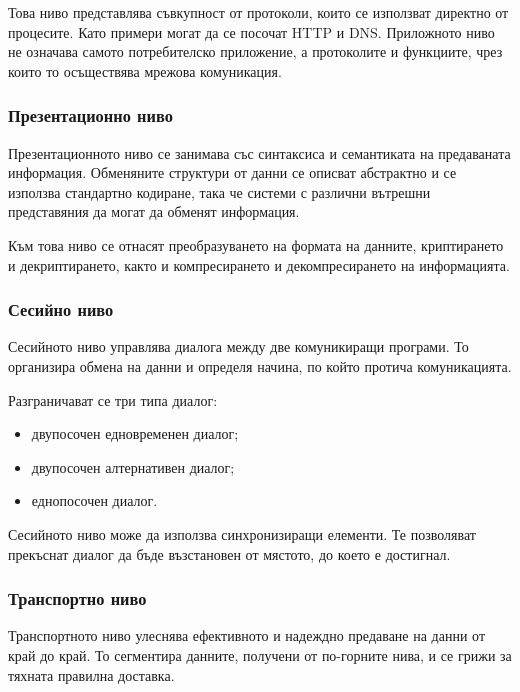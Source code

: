 Това ниво представлява съвкупност от протоколи, които се използват директно от процесите. Като примери могат да се посочат HTTP и DNS. Приложното ниво не означава самото потребителско приложение, а протоколите и функциите, чрез които то осъществява мрежова комуникация.

\subsubsection{Презентационно ниво}

\begin{defn}
Презентационното ниво се занимава със синтаксиса и семантиката на предаваната информация. Обменяните структури от данни се описват абстрактно и се използва стандартно кодиране, така че системи с различни вътрешни представяния да могат да обменят информация.
\end{defn}

Към това ниво се отнасят преобразуването на формата на данните, криптирането и декриптирането, както и компресирането и декомпресирането на информацията.

\subsubsection{Сесийно ниво}

\begin{defn}
Сесийното ниво управлява диалога между две комуникиращи програми. То организира обмена на данни и определя начина, по който протича комуникацията.
\end{defn}

Разграничават се три типа диалог:

\begin{itemize}
    \item двупосочен едновременен диалог;
    \item двупосочен алтернативен диалог;
    \item еднопосочен диалог.
\end{itemize}

Сесийното ниво може да използва синхронизиращи елементи. Те позволяват прекъснат диалог да бъде възстановен от мястото, до което е достигнал.

\subsubsection{Транспортно ниво}

\begin{defn}
Транспортното ниво улеснява ефективното и надеждно предаване на данни от край до край. То сегментира данните, получени от по-горните нива, и се грижи за тяхната правилна доставка.
\end{defn}


